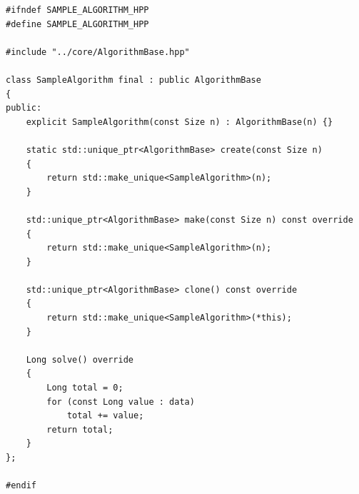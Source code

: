 \newpage

\label{ap:sample_algorithm}

\begin{lstlisting}[caption={Implementação de referência \lstinline{SampleAlgorithm} em C++23.}, label={lst:sample_algorithm}]
#ifndef SAMPLE_ALGORITHM_HPP
#define SAMPLE_ALGORITHM_HPP

#include "../core/AlgorithmBase.hpp"

class SampleAlgorithm final : public AlgorithmBase
{
public:
	explicit SampleAlgorithm(const Size n) : AlgorithmBase(n) {}

	static std::unique_ptr<AlgorithmBase> create(const Size n)
	{
		return std::make_unique<SampleAlgorithm>(n);
	}

	std::unique_ptr<AlgorithmBase> make(const Size n) const override
	{
		return std::make_unique<SampleAlgorithm>(n);
	}

	std::unique_ptr<AlgorithmBase> clone() const override
	{
		return std::make_unique<SampleAlgorithm>(*this);
	}

	Long solve() override
	{
		Long total = 0;
		for (const Long value : data)
			total += value;
		return total;
	}
};

#endif
\end{lstlisting}
